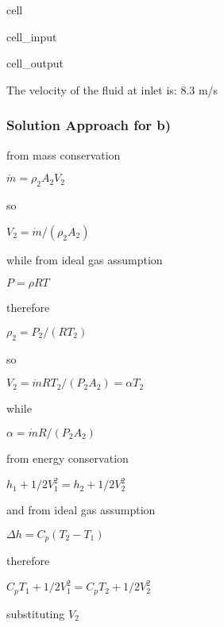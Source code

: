 \documentclass[letterpaper,10pt,english]{jupyterBook}
\begin{document}
\begin{sphinxuseclass}{cell}
\begin{sphinxVerbatimInput}
\begin{sphinxuseclass}{cell_input}
\end{sphinxuseclass}\end{sphinxVerbatimInput}
\begin{sphinxVerbatimOutput}

\begin{sphinxuseclass}{cell_output}
\begin{sphinxVerbatim}[commandchars=\\\{\}]
The velocity of the fluid at inlet is: 8.3 m/s
\end{sphinxVerbatim}

\end{sphinxuseclass}\end{sphinxVerbatimOutput}

\end{sphinxuseclass}

\subsubsection{Solution Approach for b)}
\label{\detokenize{notebooks/Chapter5/CH5-Q9:solution-approach-for-b}}
\sphinxAtStartPar
from mass conservation

\sphinxAtStartPar
\(\dot m=\rho_2 A_2V_2\)

\sphinxAtStartPar
so

\sphinxAtStartPar
\(V_2=\dot m/(\rho_2A_2)\)

\sphinxAtStartPar
while from ideal gas assumption

\sphinxAtStartPar
\(P=\rho RT\)

\sphinxAtStartPar
therefore

\sphinxAtStartPar
\(\rho_2=P_2/(RT_2)\)

\sphinxAtStartPar
so

\sphinxAtStartPar
\(V_2=\dot m RT_2/(P_2A_2)=\alpha T_2\)

\sphinxAtStartPar
while

\sphinxAtStartPar
\(\alpha=\dot m R/(P_2A_2)\)

\sphinxAtStartPar
from energy conservation

\sphinxAtStartPar
\(h_1+1/2V_1^2=h_2+1/2V_2^2\)

\sphinxAtStartPar
and from ideal gas assumption

\sphinxAtStartPar
\(\Delta h=C_p(T_2-T_1)\)

\sphinxAtStartPar
therefore

\sphinxAtStartPar
\(C_pT_1+1/2V_1^2=C_pT_2+1/2V_2^2\)

\sphinxAtStartPar
substituting \(V_2\)
\end{document}

